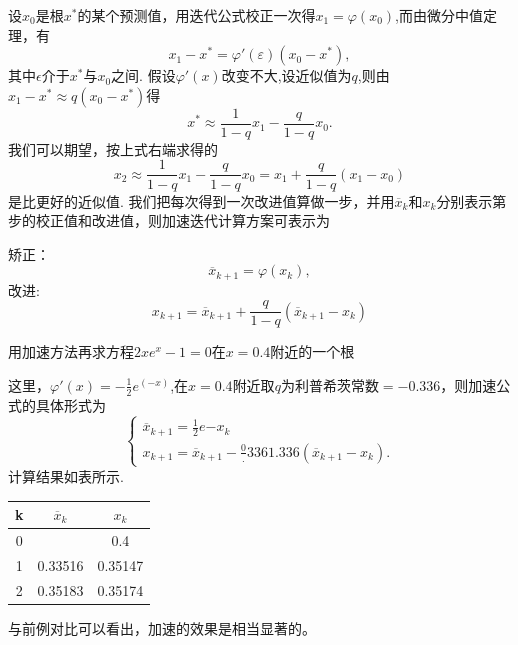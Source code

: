 设$x_0$是根$x^*$的某个预测值，用迭代公式校正一次得$x_1=\varphi(x_0)$,而由微分中值定理，有
\begin{equation}
  x_1-x^*=\varphi'(\varepsilon)(x_0-x^*),
\end{equation}
其中$\epsilon$介于$x^*$与$x_0$之间.
假设$\varphi'(x)$改变不大,设近似值为$q$,则由$x_1-x^*\approx q(x_0-x^*)$得
\begin{equation}
  x^*\approx\frac 1 {1-q}x_1-\frac q {1-q}x_0.
\end{equation}
我们可以期望，按上式右端求得的
\begin{equation}
  x_2\approx\frac 1 {1-q}x_1-\frac q {1-q}x_0=x_1+\frac q {1-q}(x_1-x_0) 
\end{equation}
是比更好的近似值.
我们把每次得到一次改进值算做一步，并用$\overline{x}_{k}$和$x_k$分别表示第步的校正值和改进值，则加速迭代计算方案可表示为

\noindent 矫正：
\begin{equation}
  \overline{x}_{k+1}=\varphi(x_k),
\end{equation}
改进:
\begin{equation}
  x_{k+1}=\overline{x}_{k+1}+\frac q {1-q}(\overline{x}_{k+1}-x_k)
\end{equation}
\begin{exmp}
用加速方法再求方程$2xe^x-1=0$在$x=0.4$附近的一个根
\end{exmp}
\begin{solution}
  这里，$\varphi'(x)=-\frac 1 2e^(-x)$,在$x=0.4$附近取$q为利普希茨常数=-0.336$，则加速公式的具体形式为
\begin{equation}
  \begin{cases}
    \overline{x}_{k+1}=\frac 1 2 e{-x_k}\\
    x_{k+1}=\overline{x}_{k+1}-\frac 0.336 1.336(\overline{x}_{k+1}-x_k).
  \end{cases}
\end{equation}
计算结果如表所示.\\
\begin{table}[htbp]
\centering
\label{tab:threesome}
\begin{tabular}{|c|c|c|}
 \hline
 k&$\overline{x}_{k}$&$x_k$\\
 \hline
 0&{ }&0.4\\
 1&0.33516&0.35147\\
 2&0.35183&0.35174\\
\hline
\end{tabular}
\end{table}

与前例对比可以看出，加速的效果是相当显著的。
\end{solution}
